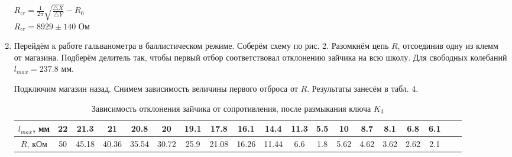 \documentclass[a4paper]{article}
\begin{document}
\begin{enumerate}
          \begin{center}
              $R_\text{cr} = \frac{1}{2\pi}\sqrt{\frac{\triangle X}{\triangle Y}} - R_0$ \\
              $R_\text{cr} = 8929 \pm 140$ Ом
          \end{center}

    \item Перейдём к работе гальванометра в баллистическом режиме. Соберём схему по рис. 2. Разомкнём цепь $R$, отсоединив одну из клемм от магазина. Подберём делитель так, чтобы первый отбор соответствовал отклонению зайчика на всю школу. Для свободных колебаний $l_{max} = 237.8$ мм. \par
          Подключим магазин назад. Снимем зависимость величины первого отброса от $R$. Результаты занесём в табл. 4.


          \begin{table}[H]
              \centering
              \begin{center}
                  \caption{Зависимость отклонения зайчика от сопротивления, после размыкания ключа $K_3$}
              \end{center}
              \vspace{0.1cm}
              \label{tab:my_label}
              \begin{tabular}{ |c|c|c|c|c|c|c|c|c|c|c|c|c|c|c|c|c|c|c|}
                  \hline

                  $l_{max}$, мм & 22 & 21.3 & 21 & 20.8 & 20 & 19.1 & 17.8 & 16.1 & 14.4 & 11.3 & 5.5 & 10 & 8.7 & 8.1 & 6.8 & 6.1 \\
                  \hline
                  $R$, кОм      & 50 & 45.18 & 40.36 & 35.54 & 30.72 & 25.9 & 21.08 & 16.26 & 11.44 & 6.6 & 1.8 & 5.62 & 4.62 & 3.62 & 2.62 & 2.1 \\
                  \hline
              \end{tabular}
          \end{table}


\end{enumerate}
\end{document}
